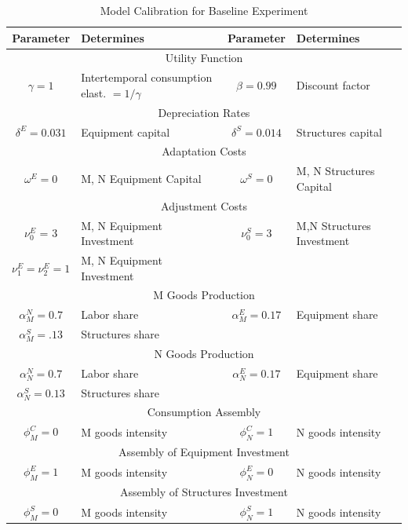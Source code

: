\documentclass[12pt,fleqn]{article}
\renewcommand{\baselinestretch}{1.5}
\begin{document}
\clearpage
\normalsize
\begin{table}[tbp] \caption{Model Calibration for Baseline Experiment}
\label{table_constantparameters} \center \renewcommand{%
\baselinestretch}{1.1} \footnotesize
\begin{tabular}{|c|l|c|l|}
\hline\hline Parameter & Determines & Parameter & Determines \\
\hline \multicolumn{4}{c}{Utility Function} \\ \hline $\gamma = 1$ &
Intertemporal consumption elast. $=1 / \gamma$ & $\beta = 0.99 $ &
Discount factor \\ \hline \multicolumn{4}{c}{Depreciation Rates} \\
\hline $\delta^E = 0.031 $ & Equipment capital & $\delta^S = 0.014 $
& Structures capital \\ \hline \multicolumn{4}{c}{Adaptation Costs}
\\ \hline $\omega^E = 0 $ & M, N Equipment Capital & $\omega^S = 0 $
& M, N Structures
Capital \\
\hline \multicolumn{4}{c}{Adjustment Costs} \\ \hline
$\nu^E_0$ = 3 & M, N Equipment Investment & $\nu^S_0 = 3 $ & M,N Structures Investment \\
$\nu^E_1=\nu^E_2=1$ & M, N Equipment Investment &  &  \\
\hline \multicolumn{4}{c}{M Goods Production} \\ \hline $\alpha^N_M
= 0.7 $ & Labor share & $\alpha^E_M = 0.17 $ & Equipment share
\\ $\alpha^S_M =.13 $ & Structures share &  &  \\
\hline \multicolumn{4}{c}{N Goods Production} \\ \hline
$\alpha^N_N = 0.7 $ & Labor share & $\alpha^E_N = 0.17$ & Equipment share \\
$\alpha^S_N = 0.13 $ & Structures share &  &  \\
\hline \multicolumn{4}{c}{Consumption Assembly} \\ \hline
$\phi^C_M = 0$ & M goods intensity & $\phi^C_N = 1$ & N goods intensity \\
\hline \multicolumn{4}{c}{Assembly of Equipment Investment} \\
\hline
$\phi^E_M = 1$ & M goods intensity & $\phi^E_N = 0$ & N goods intensity \\
\hline \multicolumn{4}{c}{Assembly of Structures Investment} \\
\hline
$\phi^S_M = 0$ & M goods intensity & $\phi^S_N = 1$ & N goods intensity \\
\hline\hline
\end{tabular}
\end{table}
\end{document}
